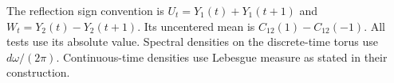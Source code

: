 \documentclass[11pt]{article}
\begin{document}
The reflection sign convention is $U_t=Y_1(t)+Y_1(t+1)$ and $W_t=Y_2(t)-Y_2(t+1)$. Its uncentered mean is $C_{12}(1)-C_{12}(-1)$. All tests use its absolute value. Spectral densities on the discrete-time torus use $d\omega/(2\pi)$. Continuous-time densities use Lebesgue measure as stated in their construction.












\begingroup

\endgroup
\end{document}
